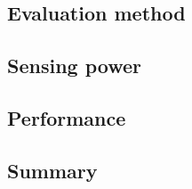 \subsection{Evaluation method}
\subsection{Sensing power}
\subsection{Performance}
\subsection{Summary}